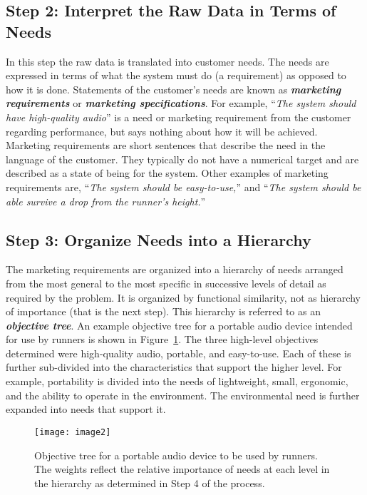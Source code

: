 \subsection*{Step 2: Interpret the Raw Data in Terms of Needs}


In this step the raw data is translated into customer needs. The needs
are expressed in terms of what the system must do (a requirement) as
opposed to how it is done. Statements of the customer's needs are known
as \textbf{\emph{marketing requirements}} or \emph{\textbf{marketing
specifications}}. For example, ``\emph{The system should have
high-quality audio}'' is a need or marketing requirement from the
customer regarding performance, but says nothing about how it will be
achieved. Marketing requirements are short sentences that describe the
need in the language of the customer. They typically do not have a
numerical target and are described as a state of being for the system.
Other examples of marketing requirements are, ``\emph{The system should
be easy-to-use,}'' and ``\emph{The system should be able survive a drop
from the runner's height.}''

\subsection*{Step 3: Organize Needs into a Hierarchy}

The marketing requirements are organized into a hierarchy of needs
arranged from the most general to the most specific in successive levels
of detail as required by the problem. It is organized by functional
similarity, not as hierarchy of importance (that is the next step). This
hierarchy is referred to as an \emph{\textbf{objective tree}}. An
example objective tree for a portable audio device intended for use by
runners is shown in Figure~\ref{figure:audioPortable}. The three high-level objectives
determined were high-quality audio, portable, and easy-to-use. Each of
these is further sub-divided into the characteristics that support the
higher level. For example, portability is divided into the needs of
lightweight, small, ergonomic, and the ability to operate in the
environment. The environmental need is further expanded into needs that
support it.

\begin{figure}
\texttt{[image: image2]}
\caption{Objective tree for a portable audio device to be
used by runners. The weights reflect the relative importance of needs at
each level in the hierarchy as determined in Step 4 of the
process.}
\label{figure:audioPortable}
\end{figure}

